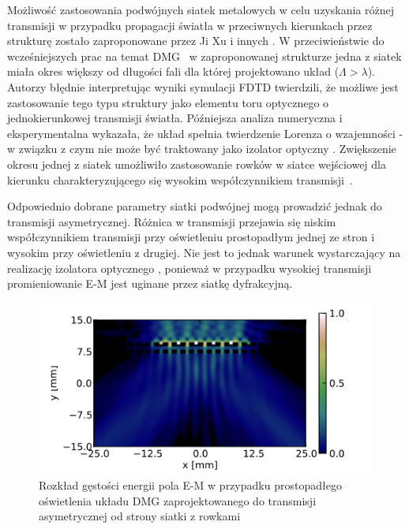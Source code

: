 Możliwość zastosowania podwójnych siatek metalowych w celu uzyskania różnej transmisji w przypadku propagacji światła w przeciwnych kierunkach przez strukturę zostało zaproponowane przez Ji Xu i innych \cite{xu2011unidirectional}. W przeciwieństwie do wcześniejszych prac na temat DMG~\cite{cheng2007controllable,cheng2008physical,chan2006optical} w zaproponowanej strukturze jedna z siatek miała okres większy od długości fali dla której projektowano układ ($\Lambda>\lambda$). Autorzy błędnie interpretując wyniki symulacji FDTD twierdzili, że możliwe jest zastosowanie tego typu struktury jako elementu toru optycznego o jednokierunkowej transmisji światła. Późniejsza analiza numeryczna i eksperymentalna wykazała, że układ spełnia twierdzenie Lorenza o wzajemności - w związku z czym nie może być  traktowany jako izolator optyczny \cite{jalas2013and}. Zwiększenie okresu jednej z siatek umożliwiło zastosowanie rowków w siatce wejściowej dla kierunku charakteryzującego się wysokim współczynnikiem transmisji~\cite{xu2011unidirectional}.

Odpowiednio dobrane parametry siatki podwójnej mogą prowadzić jednak do transmisji asymetrycznej. Różnica w transmisji przejawia się niskim współczynnikiem transmisji przy oświetleniu prostopadłym jednej ze stron i wysokim przy oświetleniu z drugiej. Nie jest to jednak warunek wystarczający na realizację izolatora optycznego \cite{jalas2013and}, ponieważ w przypadku wysokiej transmisji promieniowanie E-M jest uginane przez siatkę dyfrakcyjną. 

\begin{figure}[tb]
	\includegraphics[width=\textwidth]{images/thz/opt_lett_gora.png}
	\caption{Rozkład gęstości energii pola E-M w przypadku prostopadłego oświetlenia układu DMG zaprojektowanego do transmisji asymetrycznej od strony siatki z rowkami \cite{Stolarek:13}}
	\label{fig:trans_gora}
\end{figure}

